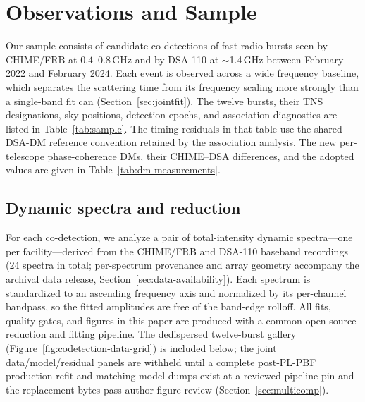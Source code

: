 \section{Observations and Sample}
\label{sec:obs}

Our sample consists of candidate co-detections of fast radio bursts seen
by CHIME/FRB \citep{CHIMEFRB2018} at $0.4$--$0.8$\,GHz and by DSA-110
\citep{Law2024} at $\sim$1.4\,GHz between February 2022 and February 2024.
Each event is observed across a wide frequency baseline, which separates the
scattering time from its frequency scaling more strongly than a single-band
fit can (Section~\ref{sec:jointfit}). The twelve bursts, their TNS designations, sky positions,
detection epochs, and association diagnostics are listed in
Table~\ref{tab:sample}. The timing residuals in that table use the shared
DSA-DM reference convention retained by the association analysis. The new
per-telescope phase-coherence DMs, their CHIME--DSA differences, and the adopted
values are given in Table~\ref{tab:dm-measurements}.



\subsection{Dynamic spectra and reduction}
\label{sec:data}

For each co-detection, we analyze a pair of total-intensity dynamic spectra---one
per facility---derived from the CHIME/FRB and DSA-110 baseband recordings
(24 spectra in total; per-spectrum provenance and array geometry accompany the
archival data release, Section~\ref{sec:data-availability}). Each spectrum is
standardized to an ascending frequency axis and normalized by its per-channel
bandpass, so the fitted amplitudes are free of the band-edge rolloff. All
fits, quality gates, and figures in this paper are produced with a common
open-source reduction and fitting pipeline.
The dedispersed twelve-burst gallery (Figure~\ref{fig:codetection-data-grid})
is included below; the joint data/model/residual panels are withheld until a
complete post-PL-PBF production refit and matching model dumps exist at a
reviewed pipeline pin and the replacement bytes pass author figure review
(Section~\ref{sec:multicomp}).

